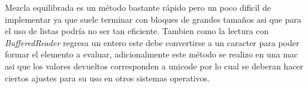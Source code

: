 \documentclass{article}
\begin{document}
	Mezcla equilibrada es un método bastante rápido pero un poco dificil de implementar ya que suele terminar con bloques de grandes tamaños asi que para el uso de listas podría no ser tan eficiente. Tambien como la lectura con \textit{BufferedReader} regresa un entero este debe convertirse a un caracter para poder formar el elemento a evaluar, adicionalmente este método se realizo en una mac asi que los valores devueltos corresponden a unicode por lo cual se deberan hacer ciertos ajustes para su uso en otros sistemas operativos.\\
	
\end{document}

